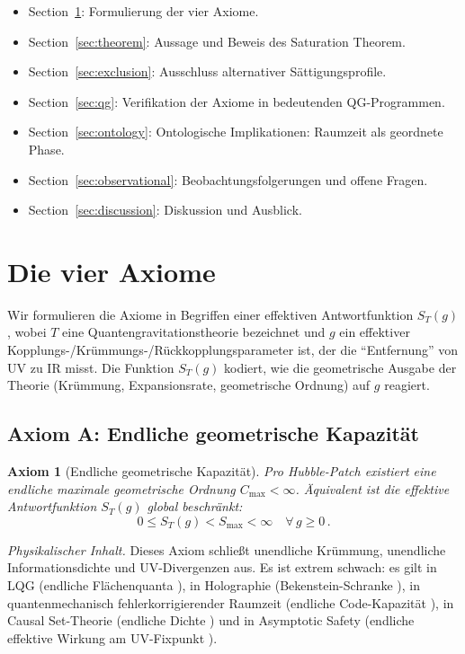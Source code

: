 \documentclass[aps,prd,twocolumn,superscriptaddress,nofootinbib]{revtex4-2}
\newtheorem{axiom}{Axiom}
\begin{document}
\begin{itemize}
\item Section~\ref{sec:axioms}: Formulierung der vier Axiome.
\item Section~\ref{sec:theorem}: Aussage und Beweis des Saturation Theorem.
\item Section~\ref{sec:exclusion}: Ausschluss alternativer Sättigungsprofile.
\item Section~\ref{sec:qg}: Verifikation der Axiome in bedeutenden QG-Programmen.
\item Section~\ref{sec:ontology}: Ontologische Implikationen: Raumzeit als geordnete Phase.
\item Section~\ref{sec:observational}: Beobachtungsfolgerungen und offene Fragen.
\item Section~\ref{sec:discussion}: Diskussion und Ausblick.
\end{itemize}


\section{Die vier Axiome}
\label{sec:axioms}

Wir formulieren die Axiome in Begriffen einer effektiven Antwortfunktion $S_T(g)$, wobei $T$ eine Quantengravitationstheorie bezeichnet und $g$ ein effektiver Kopplungs-/Krümmungs-/Rückkopplungsparameter ist, der die ``Entfernung'' von UV zu IR misst. Die Funktion $S_T(g)$ kodiert, wie die geometrische Ausgabe der Theorie (Krümmung, Expansionsrate, geometrische Ordnung) auf $g$ reagiert.

\subsection{Axiom A: Endliche geometrische Kapazität}

\begin{axiom}[Endliche geometrische Kapazität]
\label{ax:capacity}
Pro Hubble-Patch existiert eine endliche maximale geometrische Ordnung $C_{\max} < \infty$. Äquivalent ist die effektive Antwortfunktion $S_T(g)$ global beschränkt:
\begin{equation}
0 \leq S_T(g) < S_{\max} < \infty \quad \forall\, g \geq 0\,.
\end{equation}
\end{axiom}

\textit{Physikalischer Inhalt.} Dieses Axiom schließt unendliche Krümmung, unendliche Informationsdichte und UV-Divergenzen aus. Es ist extrem schwach: es gilt in LQG (endliche Flächenquanta \cite{Rovelli2004}), in Holographie (Bekenstein-Schranke \cite{Bekenstein1981}), in quantenmechanisch fehlerkorrigierender Raumzeit (endliche Code-Kapazität \cite{Almheiri2015}), in Causal Set-Theorie (endliche Dichte \cite{Sorkin2003}) und in Asymptotic Safety (endliche effektive Wirkung am UV-Fixpunkt \cite{Reuter1998}).
\end{document}
